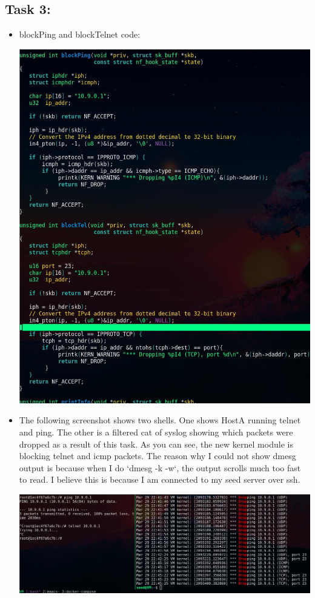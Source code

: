 \documentclass[11pt]{article}
\begin{document}
\subsection*{Task 3:}
\label{sec:orge2d9147}
\begin{itemize}
\item blockPing and blockTelnet code:
\begin{center}
\includegraphics[width=.9\linewidth]{./images/06.jpg}
\end{center}
\item The following screenshot shows two shells. One shows HostA running telnet and ping. The other is a filtered cat of syslog showing which packets were dropped as a result of this task. As you can see, the new kernel module is blocking telnet and icmp packets. The reason why I could not show dmesg output is because when I do `dmesg -k -w`, the output scrolls much too fast to read. I believe this is because I am connected to my seed server over ssh.
\begin{center}
\includegraphics[width=.9\linewidth]{./images/05.jpg}
\end{center}
\end{itemize}
\end{document}
